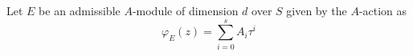 \documentclass{amsart}
\newtheorem {theorem} {\bf{Theorem}}[section]
\numberwithin {equation}{section}
\begin{document}
%    
%
 Let $E$ be an admissible $A$-module of dimension $d$ over $S$ given by the $A$-action as 
 $$\varphi_{E}(z)=\displaystyle{\sum_{i=0}^{s}}A_{i}{\tau}^{i}$$
\end{document}
